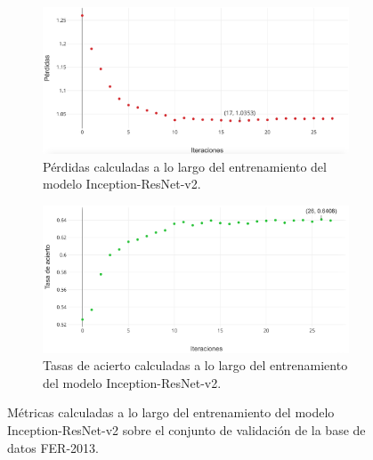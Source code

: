 
\begin{figure}
   \vspace{1cm}
    \begin{subfigure}[t]{\textwidth}
      \centering
      \includegraphics[width=\linewidth]{Images/Inception-ResNet-v2_loss.png}
      \caption{Pérdidas calculadas a lo largo del entrenamiento del modelo Inception-ResNet-v2.}
      \label{fig:Inception-ResNet-v2_loss}
    \end{subfigure}
    
    \vspace{1cm}
    \begin{subfigure}[t]{\textwidth}
      \centering
      \includegraphics[width=\linewidth]{Images/Inception-ResNet-v2_acc.png}
      \caption{Tasas de acierto calculadas a lo largo del entrenamiento del modelo Inception-ResNet-v2.}
      \label{fig:Inception-ResNet-v2_acc}
    \end{subfigure}
    \caption{Métricas calculadas a lo largo del entrenamiento del modelo Inception-ResNet-v2 sobre el conjunto de validación de la base de datos FER-2013.}
    \label{fig:Inception-ResNet-v2_metrics}
\end{figure}

